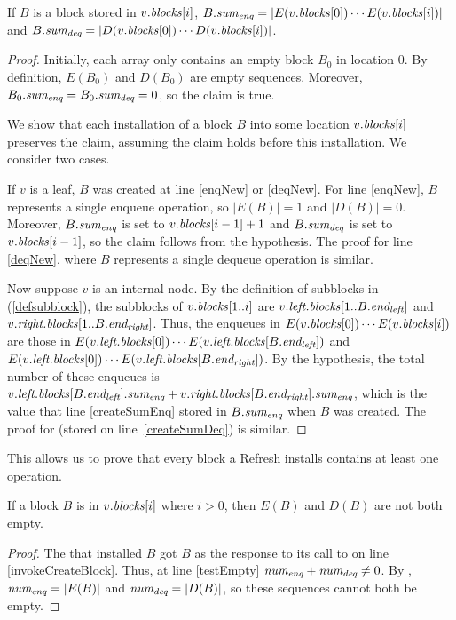 \begin{invariant}\label{lem::sum}
If $B$ is a block stored in $v.\mbox{\textit{blocks}}[i]$,
$B.\mbox{\textit{sum\textsubscript{enq}}} = | E(v.\mbox{\textit{blocks}}[0])\cdots E(v.\mbox{\textit{blocks}}[i]) |$ and
$B.\mbox{\textit{sum\textsubscript{deq}}} = | D(v.\mbox{\textit{blocks}}[0])\cdots D(v.\mbox{\textit{blocks}}[i]) |$.
\end{invariant}
\begin{proof}
Initially, each  array only contains an empty block $B_0$ in location 0.
By definition, $E(B_0)$ and $D(B_0)$ are empty sequences.
Moreover, $B_0.\mbox{\textit{sum\textsubscript{enq}}} = B_0.\mbox{\textit{sum\textsubscript{deq}}} = 0$, so the claim is true.

We show that each installation of a block $B$ into some location $v.\mbox{\textit{blocks}}[i]$ preserves the claim,
assuming the claim holds before this installation.  We consider two cases.

If $v$ is a leaf, $B$ was created at line \ref{enqNew} or \ref{deqNew}.
For line \ref{enqNew}, $B$ represents a single enqueue operation, so $|E(B)|=1$ and $|D(B)|=0$.
Moreover, $B.\mbox{\textit{sum\textsubscript{enq}}}$ is set to $v.\mbox{\textit{blocks}}[i-1]+1$ and
$B.\mbox{\textit{sum\textsubscript{deq}}}$ is set to $v.\mbox{\textit{blocks}}[i-1]$, so the claim follows from the hypothesis.
The proof for line \ref{deqNew}, where $B$ represents a single dequeue operation is similar.

Now suppose $v$ is an internal node. By the definition of subblocks in (\ref{defsubblock}), the
subblocks of $v.\mbox{\textit{blocks}}[1..i]$ are $v.\mbox{\textit{left.blocks}}[1..B.\mbox{\textit{end\textsubscript{left}}}]$ 
and $v.\mbox{\textit{right.blocks}}[1..B.\mbox{\textit{end\textsubscript{right}}}]$.
Thus, the enqueues in $E(v.\mbox{\textit{blocks}}[0])\cdots E(v.\mbox{\textit{blocks}}[i])$ are those in
$E(v.\mbox{\textit{left.blocks}}[0]) \cdots E(v.\mbox{\textit{left.blocks}}[B.\mbox{\textit{end\textsubscript{left}}}])$ and
$E(v.\mbox{\textit{left.blocks}}[0]) \cdots E(v.\mbox{\textit{left.blocks}}[B.\mbox{\textit{end\textsubscript{right}}}])$.
By the hypothesis, the total number of these enqueues is $v.\mbox{\textit{left.blocks}}[B.\mbox{\textit{end\textsubscript{left}}}].\mbox{\textit{sum\textsubscript{enq}}} + v.\mbox{\textit{right.blocks}}[B.\mbox{\textit{end\textsubscript{right}}}].\mbox{\textit{sum\textsubscript{enq}}}$, which is the value that line \ref{createSumEnq} stored in $B.\mbox{\textit{sum\textsubscript{enq}}}$ when $B$ was created.
The proof for  (stored on line~\ref{createSumDeq}) is similar.
\end{proof}

This allows us to prove that every block a Refresh installs contains at least one operation.

\begin{corollary}\label{blockNotEmpty}
If a block $B$ is in $v.\mbox{\textit{blocks}}[i]$ where $i>0$, then $E(B)$ and $D(B)$ are not both empty.
\end{corollary}
\begin{proof}
The  that installed $B$ got $B$ as the response to its call to  on line \ref{invokeCreateBlock}.
Thus, at line \ref{testEmpty} $\mbox{\textnormal{\textit{num\textsubscript{enq}}}}+\mbox{\textnormal{\textit{num\textsubscript{deq}}}}\neq 0$.
By , $\mbox{\textnormal{\textit{num\textsubscript{enq}}}} = |E(B)|$ and $\mbox{\textnormal{\textit{num\textsubscript{deq}}}} = |D(B)|$,
so these sequences cannot both be empty.
\end{proof}



